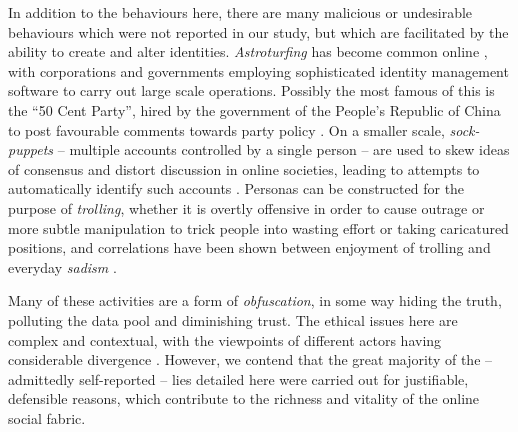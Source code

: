 \documentclass{sig-alternate}
\begin{document}
In addition to the behaviours here, there are many malicious or undesirable behaviours which were not reported in our study, but which are facilitated by the ability to create and alter identities. 
\emph{Astroturfing} \cite[e.g.]{cho2011astroturfing} has become common online \cite{zhang2014astroturfing}, with corporations and governments employing sophisticated identity management software to carry out large scale operations. 
Possibly the most famous of this is the ``50 Cent Party'', hired by the government of the People's Republic of China to post favourable comments towards party policy \cite{fiftycent}.
On a smaller scale, \emph{sock-puppets} -- multiple accounts controlled by a single person -- are used to skew ideas of consensus and distort discussion in online societies, leading to attempts to automatically identify such accounts \cite{bu2013sock,solorio2013case}. 
Personas can be constructed for the purpose of \emph{trolling}, whether it is overtly offensive in order to cause outrage or more subtle manipulation to trick people into wasting effort or taking caricatured positions, and correlations have been shown between enjoyment of trolling and everyday \emph{sadism} \cite{buckels2014trolls}.


Many of these activities are a form of \emph{obfuscation}, in some way hiding the truth, polluting the data pool and diminishing trust. The ethical issues here are complex and contextual, with the viewpoints of different actors having considerable divergence \cite{brunton2011vernacular}.
However, we contend that the great majority of the -- admittedly self-reported -- lies detailed here were carried out for justifiable, defensible reasons, which contribute to the richness and vitality of the online social fabric.


\end{document}
